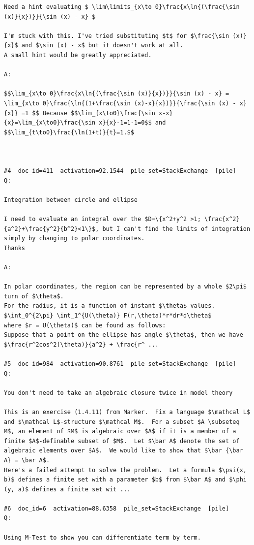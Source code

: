 \begin{verbatim}
Need a hint evaluating $ \lim\limits_{x\to 0}\frac{x\ln{(\frac{\sin (x)}{x})}}{\sin (x) - x} $

I'm stuck with this. I've tried substituting $t$ for $\frac{\sin (x)}{x}$ and $\sin (x) - x$ but it doesn't work at all. 
A small hint would be greatly appreciated. 

A:

$$\lim_{x\to 0}\frac{x\ln{(\frac{\sin (x)}{x})}}{\sin (x) - x} =  \lim_{x\to 0}\frac{\ln{(1+\frac{\sin (x)-x}{x})}}{\frac{\sin (x) - x}{x}} =1 $$ Because $$\lim_{x\to0}\frac{\sin x-x}{x}=\lim_{x\to0}\frac{\sin x}{x}-1=1-1=0$$ and $$\lim_{t\to0}\frac{\ln(1+t)}{t}=1.$$



#4  doc_id=411  activation=92.1544  pile_set=StackExchange  [pile]
Q:

Integration between circle and ellipse

I need to evaluate an integral over the $D=\{x^2+y^2 >1; \frac{x^2}{a^2}+\frac{y^2}{b^2}<1\}$, but I can't find the limits of integration simply by changing to polar coordinates.
Thanks

A:

In polar coordinates, the region can be represented by a whole $2\pi$ turn of $\theta$.
For the radius, it is a function of instant $\theta$ values.
$\int_0^{2\pi} \int_1^{U(\theta)} F(r,\theta)*r*dr*d\theta$
where $r = U(\theta)$ can be found as follows:
Suppose that a point on the ellipse has angle $\theta$, then we have $\frac{r^2cos^2(\theta)}{a^2} + \frac{r^ ...

#5  doc_id=984  activation=90.8761  pile_set=StackExchange  [pile]
Q:

You don't need to take an algebraic closure twice in model theory

This is an exercise (1.4.11) from Marker.  Fix a language $\mathcal L$ and $\mathcal L$-structure $\mathcal M$.  For a subset $A \subseteq M$, an element of $M$ is algebraic over $A$ if it is a member of a finite $A$-definable subset of $M$.  Let $\bar A$ denote the set of algebraic elements over $A$.  We would like to show that $\bar {\bar A} = \bar A$.
Here's a failed attempt to solve the problem.  Let a formula $\psi(x, b)$ defines a finite set with a parameter $b$ from $\bar A$ and $\phi (y, a)$ defines a finite set wit ...

#6  doc_id=6  activation=88.6358  pile_set=StackExchange  [pile]
Q:

Using M-Test to show you can differentiate term by term.


\end{verbatim}
